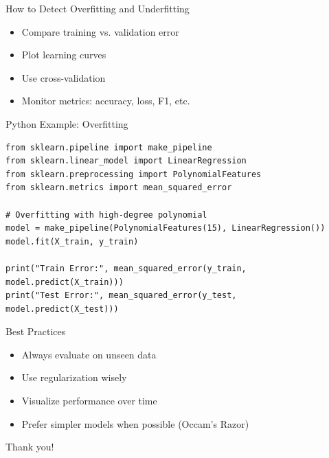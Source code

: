 \documentclass{beamer}
\begin{document}
\begin{frame}{How to Detect Overfitting and Underfitting}
  \begin{itemize}
    \item Compare training vs. validation error
    \item Plot learning curves
    \item Use cross-validation
    \item Monitor metrics: accuracy, loss, F1, etc.
  \end{itemize}
\end{frame}

\begin{frame}[fragile]{Python Example: Overfitting}
  \small
\begin{verbatim}
from sklearn.pipeline import make_pipeline
from sklearn.linear_model import LinearRegression
from sklearn.preprocessing import PolynomialFeatures
from sklearn.metrics import mean_squared_error

# Overfitting with high-degree polynomial
model = make_pipeline(PolynomialFeatures(15), LinearRegression())
model.fit(X_train, y_train)

print("Train Error:", mean_squared_error(y_train, model.predict(X_train)))
print("Test Error:", mean_squared_error(y_test, model.predict(X_test)))
\end{verbatim}
\end{frame}

\begin{frame}{Best Practices}
  \begin{itemize}
    \item Always evaluate on unseen data
    \item Use regularization wisely
    \item Visualize performance over time
    \item Prefer simpler models when possible (Occam's Razor)
  \end{itemize}
\end{frame}


\begin{frame}[standout]
    Thank you!
\end{frame}
\end{document}
